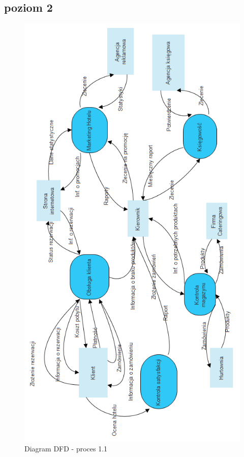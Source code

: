 \documentclass[a4paper, 11pt]{article}
\begin{document}
	\subsection{poziom 2}
	\indent
	\begin{figure}[H]%
			\center
			\includegraphics[scale=0.7]{Img/DFDpoziom0.png}
			\caption{Diagram DFD - proces 1.1}
	\end{figure}
\end{document}
